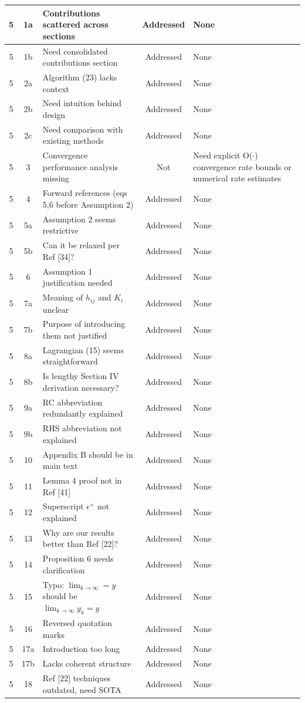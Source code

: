 \documentclass[journal,twoside,web]{ieeecolor}
\begin{document}
\begin{longtable}{|c|c|p{5.5cm}|c|p{3.5cm}|}
5 & 1a & Contributions scattered across sections & Addressed & None \\
\hline
5 & 1b & Need consolidated contributions section & Addressed & None \\
\hline
5 & 2a & Algorithm (23) lacks context & Addressed & None \\
\hline
5 & 2b & Need intuition behind design & Addressed & None \\
\hline
5 & 2c & Need comparison with existing methods & Addressed & None \\
\hline
5 & 3 & Convergence performance analysis missing & Not & Need explicit O($\cdot$) convergence rate bounds or numerical rate estimates \\
\hline
5 & 4 & Forward references (eqs 5,6 before Assumption 2) & Addressed & None \\
\hline
5 & 5a & Assumption 2 seems restrictive & Addressed & None \\
\hline
5 & 5b & Can it be relaxed per Ref [34]? & Addressed & None \\
\hline
5 & 6 & Assumption 1 justification needed & Addressed & None \\
\hline
5 & 7a & Meaning of $h_{ij}$ and $K_i$ unclear & Addressed & None \\
\hline
5 & 7b & Purpose of introducing them not justified & Addressed & None \\
\hline
5 & 8a & Lagrangian (15) seems straightforward & Addressed & None \\
\hline
5 & 8b & Is lengthy Section IV derivation necessary? & Addressed & None \\
\hline
5 & 9a & RC abbreviation redundantly explained & Addressed & None \\
\hline
5 & 9b & RHS abbreviation not explained & Addressed & None \\
\hline
5 & 10 & Appendix B should be in main text & Addressed & None \\
\hline
5 & 11 & Lemma 4 proof not in Ref [41] & Addressed & None \\
\hline
5 & 12 & Superscript $\epsilon^+$ not explained & Addressed & None \\
\hline
5 & 13 & Why are our results better than Ref [22]? & Addressed & None \\
\hline
5 & 14 & Proposition 6 needs clarification & Addressed & None \\
\hline
5 & 15 & Typo: $\lim_{k\to\infty}=y$ should be $\lim_{k\to\infty}y_k=y$ & Addressed & None \\
\hline
5 & 16 & Reversed quotation marks & Addressed & None \\
\hline
5 & 17a & Introduction too long & Addressed & None \\
\hline
5 & 17b & Lacks coherent structure & Addressed & None \\
\hline
5 & 18 & Ref [22] techniques outdated, need SOTA & Addressed & None \\
\hline


\end{longtable}
\end{document}
